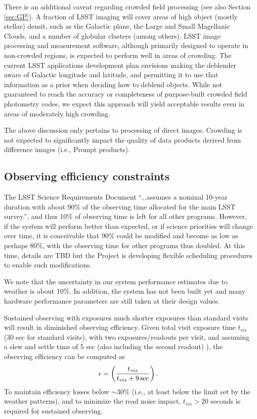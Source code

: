 \documentclass[DM,lsstdraft,toc,usenatbib]{lsstdoc}
\begin{document}
There is an additional caveat regarding crowded field processing (see also Section \ref{sec:GP}). 
A fraction of LSST imaging will cover areas of high object (mostly stellar) densit, such as the 
Galactic plane, the Large and Small Magellanic Clouds, and a number of globular clusters (among 
others). LSST image processing and measurement software, although primarily designed to operate 
in non-crowded regions, is expected to perform well in areas of crowding. The current LSST applications 
development plan envisions making the deblender aware of Galactic longitude and latitude, and 
permitting it to use that information as a prior when deciding how to deblend objects. While not 
guaranteed to reach the accuracy or completeness of purpose-built crowded field photometry codes, 
we expect this approach will yield acceptable results even in areas of moderately high crowding.

The above discussion only pertains to processing of direct images. Crowding is not expected to 
significantly impact the quality of data products derived from difference images (i.e., Prompt 
products).


\subsection{Observing efficiency constraints} 

The LSST Science Requirements Document  ``...assumes a nominal 10-year duration with about 90\% 
of the observing time allocated for the main LSST survey.'', and thus 10\% of observing time is left for 
all other programs. However, if the system will perform better than expected, or if science priorities 
will change over time, it is conceivable that 90\% could be modified and become as low as perhaps 80\%, 
with the observing time for other programs thus doubled. At this time, details are TBD but the Project
is developing flexible scheduling procedures to enable such modifications. 

We note that the uncertainty in our system performance estimates due to weather is about 10\%.
In addition, the system has not been built yet and many hardware performance parameters are
still taken at their design values.  

Sustained observing with exposures much shorter exposures than standard visits will result
in diminished observing efficiency. Given total visit exposure time $t_{vis}$ (30 sec for standard
visits), with two exposures/readouts per visit, and assuming a slew and settle time of 5 sec 
(also including the second readout) ), the observing efficiency can be computed as 
\begin{equation}
     \epsilon = \left( {t_{vis} \over t_{vis} + 9 \, \mathrm{sec}}\right).
\end{equation}
To maintain efficiency losses below $\sim$30\% (i.e., at least below the limit set by the weather patterns),
and to minimize the read noise impact, $t_{vis} > 20$ seconds is required for sustained observing. 
\end{document}
